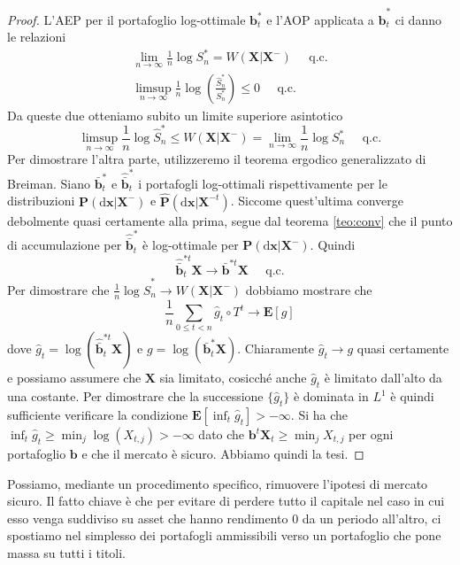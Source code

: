 \documentclass[a4paper,11pt]{book}
\theoremstyle{plain}
\theoremstyle{definition}
\theoremstyle{remark}
\newcommand{\dX}{\text{d}\bm{x}}
\newcommand{\X}{\bm{X}}
\newcommand{\B}{\bm{b}}
\newcommand{\Pro}{\mathbf{P}}
\newcommand{\E}{\mathbf{E}}
\newcommand{\bh}{\hat{\bm{b}}}
\newcommand{\Sh}{\hat{S}}
\newcommand{\Ph}{\hat{\mathbf{P}}}
\begin{document}
\begin{proof}
	L'AEP per il portafoglio log-ottimale $\B^*_t$ e l'AOP applicata a $\bh^*_t$ ci danno le relazioni
	\begin{align*}
		\lim\limits_{n\to\infty}\frac{1}{n}\log S^*_n=W(\X|\X^{-})\;\;\;\;\; \text{q.c.}\\
		\limsup\limits_{n\to\infty}\frac{1}{n}\log\left(\frac{\Sh_n^*}{S^*_n}\right)\leq 0 \;\;\;\;\; \text{q.c.}
	\end{align*}
	Da queste due otteniamo subito un limite superiore asintotico
	\begin{equation*}
		\limsup\limits_{n\to \infty}\frac{1}{n}\log \Sh_n^*\leq W(\X|\X^{-}) =\lim\limits_{n\to\infty}\frac{1}{n}\log S^*_n \;\;\;\;\; \text{q.c.}
	\end{equation*}
	Per dimostrare l'altra parte, utilizzeremo il teorema ergodico generalizzato di Breiman.\newline
	Siano $\bar{\B}^*_t$ e $\hat{\bar{\B}}^*_t$ i portafogli log-ottimali rispettivamente per le distribuzioni $\Pro(\dX|\X^-)$ e $\Ph(\dX|\X^{-t})$. Siccome quest'ultima converge debolmente quasi certamente alla prima, segue dal teorema \ref{teo:conv} che il punto di accumulazione per $\hat{\bar{\B}}^*_t$ è log-ottimale per $\Pro(\dX|\X^-)$. Quindi
	\begin{equation*}
		\hat{\bar{\B}}^{*t}_t\X \rightarrow \bar{\B}^{*t}\X \;\;\;\;\; \text{q.c.}
	\end{equation*}
	Per dimostrare che $\frac{1}{n}\log\Sh^*_n\rightarrow W(\X|\X^{-})$ dobbiamo mostrare che
	\begin{equation*}
		\frac{1}{n}\sum_{0\leq t<n}\hat{g}_t\circ T^t\rightarrow \E[g]
	\end{equation*}
	dove $\hat{g}_t = \log(\hat{\bar{\B}}^{*t}_t\X)$ e $g = \log(\bar{\B}^*_t\X)$. Chiaramente $\hat{g}_t\rightarrow g$ quasi certamente e possiamo assumere che $\X$ sia limitato, cosicché anche $\hat{g}_t$ è limitato dall'alto da una costante. Per dimostrare che la successione $\{\hat{g}_t\}$ è dominata in $L^1$ è quindi sufficiente verificare la condizione $\E[\inf_t \hat{g}_t]>-\infty$. Si ha che $\inf_t \hat{g}_t\geq \min_j \log(X_{t,j})>-\infty$ dato che $\B^t\X_t\geq \min_jX_{t,j}$ per ogni portafoglio $\B$ e che il mercato è sicuro. Abbiamo quindi la tesi.
\end{proof}
Possiamo, mediante un procedimento specifico, rimuovere l'ipotesi di mercato sicuro. Il fatto chiave è che per evitare di perdere tutto il capitale nel caso in cui esso venga suddiviso su asset che hanno rendimento $0$ da un periodo all'altro, ci spostiamo nel simplesso dei portafogli ammissibili verso un portafoglio che pone massa su tutti i titoli.\newline
\end{document}

